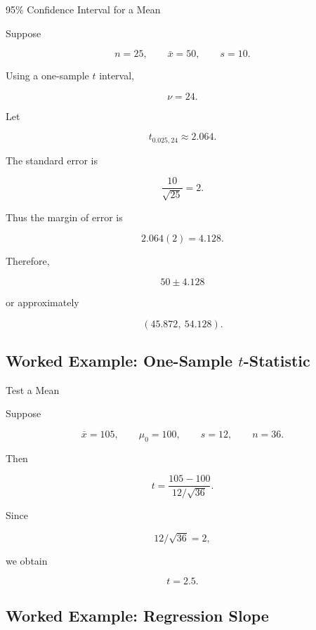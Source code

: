 \begin{workedexamplebox}{95\% Confidence Interval for a Mean}

Suppose

\[
n=25,
\qquad
\bar{x}=50,
\qquad
s=10.
\]

Using a one-sample \(t\) interval,

\[
\nu=24.
\]

Let

\[
t_{0.025,24}
\approx
2.064.
\]

The standard error is

\[
\frac{10}{\sqrt{25}}
=
2.
\]

Thus the margin of error is

\[
2.064(2)
=
4.128.
\]

Therefore,

\begin{answerbox}
\[
\boxed{
50\pm4.128
}
\]

or approximately

\[
\boxed{
(45.872,\ 54.128).
}
\]
\end{answerbox}

\end{workedexamplebox}

\subsection{Worked Example: One-Sample \(t\)-Statistic}
\label{subsec:worked-one-sample-t}

\begin{workedexamplebox}{Test a Mean}

Suppose

\[
\bar{x}=105,
\qquad
\mu_0=100,
\qquad
s=12,
\qquad
n=36.
\]

Then

\[
t
=
\frac{
105-100
}{
12/\sqrt{36}
}.
\]

Since

\[
12/\sqrt{36}=2,
\]

we obtain

\begin{answerbox}
\[
\boxed{
t=2.5.
}
\]
\end{answerbox}

\end{workedexamplebox}

\subsection{Worked Example: Regression Slope}
\label{subsec:worked-regression-slope}

